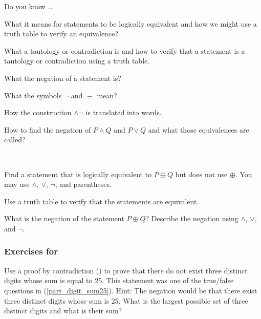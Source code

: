 \begin{exer}[\exerR] %
\label{exer_dyk_equiv_negation}
    Do you know \ldots
        \begin{exerpart}
            \item What it means for statements to be logically equivalent and how we might use a truth table to verify an equivalence?
            \item What a tautology or contradiction is and how to verify that a statement is a tautology or contradiction using a truth table. 
            \item What the negation of a statement is?
            \item What the symbols $\neg$ and $\equiv$ mean?
            \item How the construction $\land \neg$ is translated into words. 
            \item How to find the negation of $P \land Q$ and $P \lor Q$ and what those equivalences are called?
        \end{exerpart}
\end{exer}

\begin{exer}[\exerE] %
\label{exer_writing_xor_without_xor}
~   
    \begin{exerpart}
        \item Find a statement that is logically equivalent to $P \oplus Q$ but does not use $\oplus$. You may use $\land$, $\lor$, $\neg$, and parentheses. 
        \item Use a truth table to verify that the statements are equivalent.
        \item What is the negation of the statement $P \oplus Q$?  Describe the negation using $\land$, $\lor$, and $\neg$.
    \end{exerpart}
\end{exer}


\subsubsection*{Exercises for  \subpffcontra}

\begin{exer}[\exerP] %
\label{exer_prove_not_sum_3digits_equals25}
    Use a proof by contradiction () to prove that there do not exist three distinct digits whose sum is equal to 25.  This statement was one of the true/false questions in  (\ref{part_digit_sum25}). Hint: The negation would be that there exist three distinct digits whose sum is 25.  What is the largest possible set of three distinct digits and what is their sum?
\end{exer}

